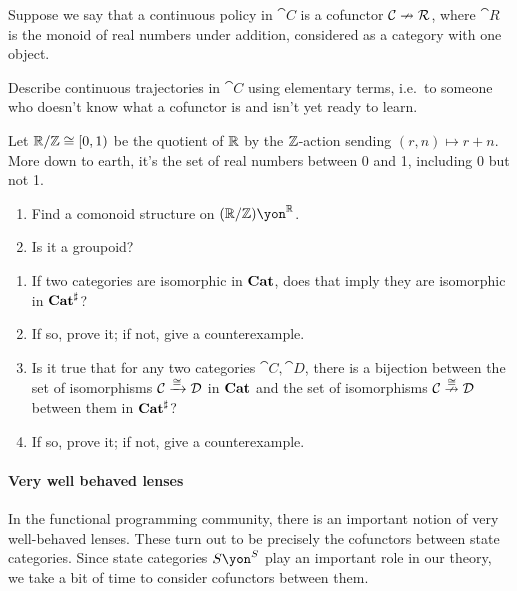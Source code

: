 \documentclass[Book-Poly]{subfiles}
\begin{document}
\begin{exercise}
Suppose we say that a continuous policy in $\cat{C}$ is a cofunctor $\mathcal{C}\nrightarrow\mathcal{R}$, where $\cat{R}$ is the monoid of real numbers under addition, considered as a category with one object. 

Describe continuous trajectories in $\cat{C}$ using elementary terms, i.e.\ to someone who doesn't know what a cofunctor is and isn't yet ready to learn.
\end{exercise}

\begin{exercise}
Let $\mathbb{R}/\mathbb{Z}\cong[0,1)$ be the quotient of $\mathbb{R}$ by the $\mathbb{Z}$-action sending $(r,n)\mapsto r+n$. More down to earth, it's the set of real numbers between 0 and 1, including 0 but not 1.%
\begin{enumerate}
	\item Find a comonoid structure on $(\rr/\zz)\yon^\rr$.
	\item Is it a groupoid?
\qedhere
\end{enumerate}
\end{exercise}

\begin{exercise}
\begin{enumerate}
	\item If two categories are isomorphic in $\mathbf{Cat}$, does that imply they are isomorphic in $\mathbf{Cat}^\sharp$?
	\item If so, prove it; if not, give a counterexample.
	\item Is it true that for any two categories $\cat{C},\cat{D}$, there is a bijection between the set of isomorphisms $\mathcal{C}\xrightarrow{\cong}\mathcal{D}$ in $\mathbf{Cat}$ and the set of isomorphisms $\mathcal{C}\overset{\cong}{\nrightarrow}\mathcal{D}$ between them in $\mathbf{Cat}^\sharp$?
	\item If so, prove it; if not, give a counterexample.
\qedhere
\end{enumerate}
\end{exercise}


\paragraph{Very well behaved lenses}

In the functional programming community, there is an important notion of very well-behaved lenses. These turn out to be precisely the cofunctors between state categories. Since state categories $S\yon^S$ play an important role in our theory, we take a bit of time to consider cofunctors between them.
\end{document}
